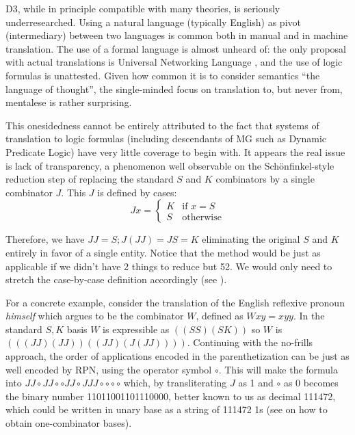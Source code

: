 \documentclass[output=paper]{langscibook}
\begin{document}
D3, while in principle compatible with many theories, is
seriously under\-re\-search\-ed. Using a natural language (typically English) as
pivot (intermediary) between two languages is common both in manual and in
machine translation. The use of a formal language is almost unheard of: the
only proposal with actual translations is Universal Networking Language
\citep{Cardenosa:2005}, and the use of logic formulas is unattested. Given how
common it is to consider semantics ``the language of thought'', the
single-minded focus on translation to, but never from, mentalese is rather
surprising.

This onesidedness cannot be entirely attributed to the fact that systems of
translation to logic formulas (including descendants of MG such as Dynamic
Predicate Logic) have very little coverage to begin with. It appears the real
issue is lack of transparency, a phenomenon well observable on the
Schönfinkel-style reduction step of replacing the standard $S$ and $K$ 
combinators by a single combinator $J$. This  $J$ is defined by cases:
\[
  Jx =
  \begin{cases}
    K & \text{if } x=S\\
    S & \text{otherwise}
  \end{cases}
\]


Therefore, we have $JJ = S; J(JJ)= JS = K$ eliminating the original $S$ and $K$
entirely in favor of a single entity. Notice that the method would be just as
applicable if we didn't have 2 things to reduce but 52. We would only need to
stretch the case-by-case definition accordingly (see \cite[Chapter 1E4]{Curry:1958}). 

For a concrete example, consider the translation of the English reflexive
pronoun \textit{himself} which \citet{Szabolcsi:1987} argues to be the combinator
$W$, defined as $W x y = x y y$. In the standard $S,K$ basis $W$ is
expressible as $((SS)(SK))$ so $W$ is $(((JJ)(JJ))((JJ)(J(JJ))))$. Continuing
with the no-frills approach, the order of applications encoded in the
parenthetization can be just as well encoded by RPN, using the operator symbol
$\circ$. This will make the formula into $JJ\circ JJ\circ \circ
JJ\circ J JJ\circ \circ \circ \circ$ which, by transliterating $J$ as 1 and
$\circ$ as 0 becomes the binary number 11011001101110000, better known to us
as decimal 111472, which could be written in unary base as a string of 111472
1s (see \citet{Fokker:1989} on how to obtain one-combinator bases). 
\end{document}
